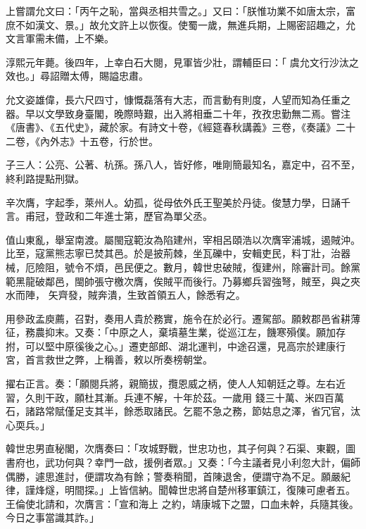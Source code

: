 \begin{pinyinscope}
 上嘗謂允文曰：「丙午之恥，當與丞相共雪之。」又曰：「朕惟功業不如唐太宗，富庶不如漢文、景。」故允文許上以恢復。使蜀一歲，無進兵期，上賜密詔趣之，允文言軍需未備，上不樂。



 淳熙元年薨。後四年，上幸白石大閱，見軍皆少壯，謂輔臣曰：「
 虞允文行沙汰之效也。」尋詔贈太傅，賜謚忠肅。



 允文姿雄偉，長六尺四寸，慷慨磊落有大志，而言動有則度，人望而知為任重之器。早以文學致身臺閣，晚際時艱，出入將相垂二十年，孜孜忠勤無二焉。嘗注《唐書》、《五代史》，藏於家。有詩文十卷，《經筵春秋講義》三卷，《奏議》二十二卷，《內外志》十五卷，行於世。



 子三人：公亮、公著、杭孫。孫八人，皆好修，唯剛簡最知名，嘉定中，召不至，終利路提點刑獄。



 辛次膺，字起季，萊州人。幼孤，從母依外氏王聖美於丹徒。俊慧力學，日誦千言。甫冠，登政和二年進士第，歷官為單父丞。



 值山東亂，舉室南渡。屬閩寇範汝為陷建州，宰相呂頤浩以次膺宰浦城，遏賊沖。比至，寇黨熊志寧已焚其邑。於是披荊棘，坐瓦礫中，安輯吏民，料丁壯，治器械，厄險阻，號令不煩，邑民便之。數月，韓世忠破賊，復建州，除審計司。餘黨範黑龍破鄰邑，閩帥張守檄次膺，俟賊平而後行。乃募鄉兵習強弩，賊至，與之夾水而陣，
 矢齊發，賊奔潰，生致首領五人，餘悉宥之。



 用參政孟庾薦，召對，奏用人貴於務實，施令在於必行。遷駕部。願敕郡邑省耕薄征，務農抑末。又奏：「中原之人，棄墳墓生業，從巡江左，饑寒殞僕。願加存拊，可以堅中原徯後之心。」遷吏部郎、湖北運判，中途召還，見高宗於建康行宮，首言救世之弊，上稱善，敕以所奏榜朝堂。



 擢右正言。奏：「願閱兵將，親簡拔，攬恩威之柄，使人人知朝廷之尊。左右近習，久則干政，願杜其漸。兵連不解，十年於茲。一歲用
 錢三十萬、米四百萬石，諸路常賦僅足支其半，餘悉取諸民。乞罷不急之務，節姑息之澤，省冗官，汰心耎兵。」



 韓世忠男直秘閣，次膺奏曰：「攻城野戰，世忠功也，其子何與？石渠、東觀，圖書府也，武功何與？幸門一啟，援例者眾。」又奏：「今主議者見小利忽大計，偏師偶勝，遽思進討，便謂攻為有餘；警奏稍聞，首陳退舍，便謂守為不足。願嚴紀律，謹烽燧，明間探。」上皆信納。聞韓世忠將自楚州移軍鎮江，復陳可慮者五。王倫使北請和，次膺言：「宣和海上
 之約，靖康城下之盟，口血未幹，兵隨其後。今日之事當識其詐。」




\end{pinyinscope}
